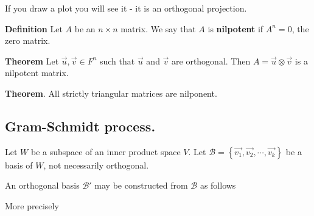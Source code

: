 \documentclass{article}
\begin{document}
If you draw a plot you will see it - it is an orthogonal projection.


\textbf{Definition} Let $A$ be an $n \times n$ matrix. We say that $A$ is \textbf{nilpotent} if $A^n = 0$, the zero matrix.

\textbf{Theorem} Let $\vec{u}, \vec{v} \in F^n$ such that $\vec{u}$ and $\vec{v}$ are orthogonal. Then $A = \vec{u} \otimes \vec{v}$ is a nilpotent matrix.

\textbf{Theorem}. All strictly triangular matrices are nilponent.



\subsection{Gram-Schmidt process.}
Let $W$ be a subspace of an inner product space $V$. Let 
$\mathcal{B} = \left\lbrace \vec{v_{1}}, \vec{v_{2}}, \cdots ,\vec{v_{k}} \right\rbrace $ be a basis of $
W$, not necessarily orthogonal. 

An orthogonal basis $\mathcal{B'}$ may be constructed from $\mathcal{B}$ as follows


More precisely

\end{document}
